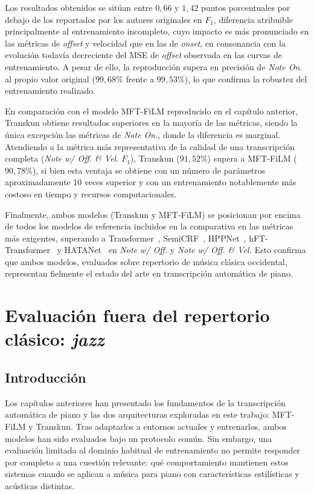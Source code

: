 \documentclass[11pt,spanish,listoffigures,listoftables]{tfgetsinf}
\begin{document}
Los resultados obtenidos se sitúan entre $0{,}66$ y $1{,}42$ puntos porcentuales 
por debajo de los reportados por los autores originales en $F_1$, diferencia 
atribuible principalmente al entrenamiento incompleto, cuyo impacto es más 
pronunciado en las métricas de \textit{offset} y velocidad que en las de 
\textit{onset}, en consonancia con la evolución todavía decreciente del MSE de 
\textit{offset} observada en las curvas de entrenamiento. A pesar de ello, la 
reproducción supera en precisión de \textit{Note On.} al propio valor original 
($99{,}68\%$ frente a $99{,}53\%$), lo que confirma la robustez del 
entrenamiento realizado.

En comparación con el modelo MFT-FiLM reproducido en el capítulo anterior, 
Transkun obtiene resultados superiores en la mayoría de las métricas, 
siendo la única excepción las  métricas de \textit{Note On.}, donde la diferencia es 
marginal. Atendiendo a la métrica más representativa de la calidad de una 
transcripción completa (\textit{Note w/ Off. \& Vel.} $F_1$), Transkun 
($91{,}52\%$) supera a MFT-FiLM ($90{,}78\%$), si bien esta ventaja se 
obtiene con un número de parámetros aproximadamente 10 veces superior y con un 
entrenamiento notablemente más costoso en tiempo y recursos computacionales.

Finalmente, ambos modelos (Transkun y MFT-FiLM) se posicionan por 
encima de todos los modelos de referencia incluidos en la comparativa en las 
métricas más exigentes, superando a Transformer~\cite{hawthorne2021seq2seq}, 
SemiCRF~\cite{yan2021semicrf1}, HPPNet~\cite{wei2022hppnet}, 
hFT-Transformer~\cite{toyama2023hftt} y HATANet~\cite{wang2024hatanet} en 
\textit{Note w/ Off.} y \textit{Note w/ Off. \& Vel.} Esto confirma que ambos 
modelos, evaluados sobre repertorio de música clásica occidental, 
representan fielmente el estado del arte en transcripción automática de piano.


\chapter{Evaluación fuera del repertorio clásico: \textit{jazz}}
\label{chap:comparacion_jazz}

\section{Introducción}
\label{sec:intro_comparacion_jazz}

Los capítulos anteriores han presentado los fundamentos de la transcripción automática
de piano y las dos arquitecturas exploradas en este trabajo: MFT-FiLM y Transkun. Tras
adaptarlos a entornos actuales y entrenarlos, ambos modelos han
sido evaluados bajo un protocolo común. Sin embargo, una evaluación limitada al
dominio habitual de entrenamiento no permite responder por completo a una cuestión
relevante: qué comportamiento mantienen estos sistemas cuando se aplican a música
para piano con características estilísticas y acústicas distintas.
\end{document}
